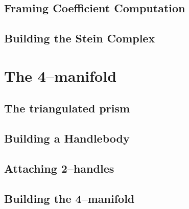 	\subsection{Framing Coefficient Computation}
	\label{sub:gleams}
	
	
	\subsection{Building the Stein Complex}
	\label{sub:steinbuild}
	

\section{The 4--manifold}
\label{sec:4man}


	\subsection{The triangulated prism}
	\label{sub:nprism}
	
	
	\subsection{Building a Handlebody}
	\label{sub:handlebody}
	
	
	\subsection{Attaching 2--handles}
	\label{sub:2handles}
	
	
	\subsection{Building the 4--manifold}
	\label{sub:final}
	

